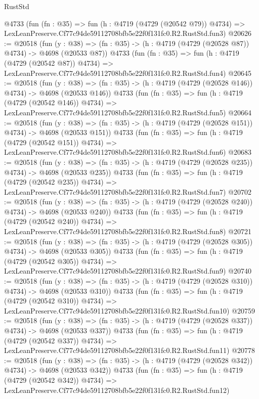 \begin{lexlean}{RustStd}
\begin{coremodule}
    @4733
    (fun (fn : @35) =>
    fun (h : @4719 (@4729 (@20542 @79)) @4734) =>
    LexLeanPreserve.Cf77c94de59112708bfb5e22f0f131fc0.R2.RustStd.fun3)
@20626 := @20518
    (fun (y : @38) => (fn : @35) -> (h : @4719 (@4729 (@20528 @87)) @4734) -> @4698 (@20533 @87))
    @4733
    (fun (fn : @35) =>
    fun (h : @4719 (@4729 (@20542 @87)) @4734) =>
    LexLeanPreserve.Cf77c94de59112708bfb5e22f0f131fc0.R2.RustStd.fun4)
@20645 := @20518
    (fun (y : @38) => (fn : @35) -> (h : @4719 (@4729 (@20528 @146)) @4734) -> @4698 (@20533 @146))
    @4733
    (fun (fn : @35) =>
    fun (h : @4719 (@4729 (@20542 @146)) @4734) =>
    LexLeanPreserve.Cf77c94de59112708bfb5e22f0f131fc0.R2.RustStd.fun5)
@20664 := @20518
    (fun (y : @38) => (fn : @35) -> (h : @4719 (@4729 (@20528 @151)) @4734) -> @4698 (@20533 @151))
    @4733
    (fun (fn : @35) =>
    fun (h : @4719 (@4729 (@20542 @151)) @4734) =>
    LexLeanPreserve.Cf77c94de59112708bfb5e22f0f131fc0.R2.RustStd.fun6)
@20683 := @20518
    (fun (y : @38) => (fn : @35) -> (h : @4719 (@4729 (@20528 @235)) @4734) -> @4698 (@20533 @235))
    @4733
    (fun (fn : @35) =>
    fun (h : @4719 (@4729 (@20542 @235)) @4734) =>
    LexLeanPreserve.Cf77c94de59112708bfb5e22f0f131fc0.R2.RustStd.fun7)
@20702 := @20518
    (fun (y : @38) => (fn : @35) -> (h : @4719 (@4729 (@20528 @240)) @4734) -> @4698 (@20533 @240))
    @4733
    (fun (fn : @35) =>
    fun (h : @4719 (@4729 (@20542 @240)) @4734) =>
    LexLeanPreserve.Cf77c94de59112708bfb5e22f0f131fc0.R2.RustStd.fun8)
@20721 := @20518
    (fun (y : @38) => (fn : @35) -> (h : @4719 (@4729 (@20528 @305)) @4734) -> @4698 (@20533 @305))
    @4733
    (fun (fn : @35) =>
    fun (h : @4719 (@4729 (@20542 @305)) @4734) =>
    LexLeanPreserve.Cf77c94de59112708bfb5e22f0f131fc0.R2.RustStd.fun9)
@20740 := @20518
    (fun (y : @38) => (fn : @35) -> (h : @4719 (@4729 (@20528 @310)) @4734) -> @4698 (@20533 @310))
    @4733
    (fun (fn : @35) =>
    fun (h : @4719 (@4729 (@20542 @310)) @4734) =>
    LexLeanPreserve.Cf77c94de59112708bfb5e22f0f131fc0.R2.RustStd.fun10)
@20759 := @20518
    (fun (y : @38) => (fn : @35) -> (h : @4719 (@4729 (@20528 @337)) @4734) -> @4698 (@20533 @337))
    @4733
    (fun (fn : @35) =>
    fun (h : @4719 (@4729 (@20542 @337)) @4734) =>
    LexLeanPreserve.Cf77c94de59112708bfb5e22f0f131fc0.R2.RustStd.fun11)
@20778 := @20518
    (fun (y : @38) => (fn : @35) -> (h : @4719 (@4729 (@20528 @342)) @4734) -> @4698 (@20533 @342))
    @4733
    (fun (fn : @35) =>
    fun (h : @4719 (@4729 (@20542 @342)) @4734) =>
    LexLeanPreserve.Cf77c94de59112708bfb5e22f0f131fc0.R2.RustStd.fun12)

\end{coremodule}
\end{lexlean}
